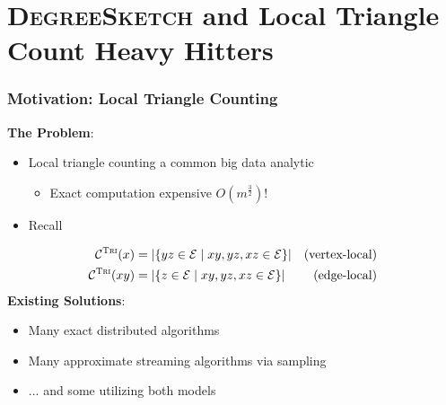 \documentclass{beamer}
\newcommand{\algoname}[1]{\textnormal{\textsc{#1}}}
\begin{document}
\section{\algoname{DegreeSketch} and Local Triangle Count Heavy Hitters}


\begin{frame}
\frametitle{Motivation: Local Triangle Counting}

\textbf{The Problem}:
\begin{itemize}
	\item Local triangle counting a common big data analytic
	\begin{itemize}
		\item Exact computation expensive $O \left ( m^{\frac{3}{2}} \right )$!
	\end{itemize}
	\item Recall
\end{itemize}
%
\vspace{-0.5em}
\begin{align*}
	\mathcal{C}^{\algoname{Tri}}(x) 
	&= |\{yz \in \mathcal{E} \mid xy, yz, xz \in \mathcal{E} \}| 
	& \textnormal{(vertex-local)} \\
	\mathcal{C}^{\algoname{Tri}}(xy) 
	&= |\{z \in \mathcal{E} \mid xy, yz, xz \in \mathcal{E} \}|
	& \textnormal{(edge-local)} 
\end{align*}
%
\textbf{Existing Solutions}:
\begin{itemize}
	\item Many exact distributed algorithms \cite{arifuzzaman2013patric, pearce2017triangle}
	\item Many approximate streaming algorithms via sampling \cite{lim2015mascot, stefani2017triest}
	\item ... and some utilizing both models \cite{shin2018tri, shin2018dislr}
\end{itemize}


\end{frame}

\end{document}
